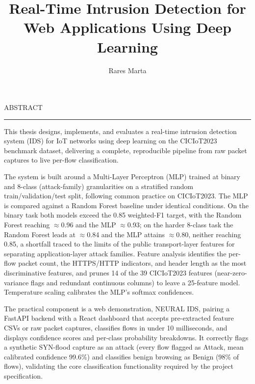 \documentclass[12pt]{report}
\begin{document}
\title{Real-Time Intrusion Detection for Web Applications Using Deep Learning}					   
\author{Rares Marta}											
				
\maketitle



\cleardoublepage
ABSTRACT
\vspace{0.5cm}	
\hrule
\vspace{0.5cm}	

This thesis designs, implements, and evaluates a real-time intrusion detection system (IDS) for IoT networks using deep learning on the CICIoT2023 benchmark dataset, delivering a complete, reproducible pipeline from raw packet captures to live per-flow classification.

The system is built around a Multi-Layer Perceptron (MLP) trained at binary and 8-class (attack-family) granularities on a stratified random train/validation/test split, following common practice on CICIoT2023. The MLP is compared against a Random Forest baseline under identical conditions. On the binary task both models exceed the 0.85 weighted-F1 target, with the Random Forest reaching $\approx$0.96 and the MLP $\approx$0.93; on the harder 8-class task the Random Forest leads at $\approx$0.84 and the MLP attains $\approx$0.80, neither reaching 0.85, a shortfall traced to the limits of the public transport-layer features for separating application-layer attack families. Feature analysis identifies the per-flow packet count, the HTTPS/HTTP indicators, and header length as the most discriminative features, and prunes 14 of the 39 CICIoT2023 features (near-zero-variance flags and redundant continuous columns) to leave a 25-feature model. Temperature scaling calibrates the MLP's softmax confidences.

The practical component is a web demonstration, NEURAL IDS, pairing a FastAPI backend with a React dashboard that accepts pre-extracted feature CSVs or raw packet captures, classifies flows in under 10 milliseconds, and displays confidence scores and per-class probability breakdowns. It correctly flags a synthetic SYN-flood capture as an attack (every flow flagged as Attack, mean calibrated confidence 99.6\%) and classifies benign browsing as Benign (98\% of flows), validating the core classification functionality required by the project specification.
\end{document}

